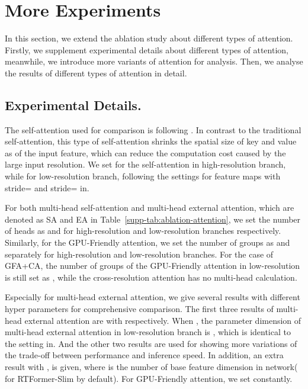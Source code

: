 \documentclass{article}
\begin{document}
\section{More Experiments}

In this section, we extend the ablation study about different types of attention. Firstly, we supplement experimental details about different types of attention, meanwhile, we introduce more variants of attention for analysis. Then, we analyse the results of different types of attention in detail.

\subsection{Experimental Details.}

The self-attention used for comparison is following \cite{xie2021segformer}. In contrast to the traditional self-attention, this type of self-attention shrinks the spatial size of key and value as  of the input feature, which can reduce the computation cost caused by the large input resolution. We set  for the self-attention in high-resolution branch, while  for low-resolution branch, following the settings for feature maps with stride= and stride= in\cite{xie2021segformer}.

For both multi-head self-attention and multi-head external attention, which are denoted as SA and EA in Table~\ref{supp-tab:ablation-attention}, we set the number of heads as  and  for high-resolution and low-resolution branches respectively. Similarly, for the GPU-Friendly attention, we set the number of groups as  and  separately for high-resolution and low-resolution branches. For the case of GFA+CA, the number of groups of the GPU-Friendly attention in low-resolution is still set as , while the cross-resolution attention has no multi-head calculation.

Especially for multi-head external attention, we give several results with different hyper parameters for comprehensive comparison. The first three results of multi-head external attention are with  respectively. When , the parameter dimension of multi-head external attention  in low-resolution branch is , which is identical to the setting in\cite{guo2021beyond}. And the other two results are used for showing more variations of the trade-off between performance and inference speed. In addition, an extra result with ,  is given, where  is the number of base feature dimension in network( for RTFormer-Slim by default). For GPU-Friendly attention, we set  constantly.
\end{document}
